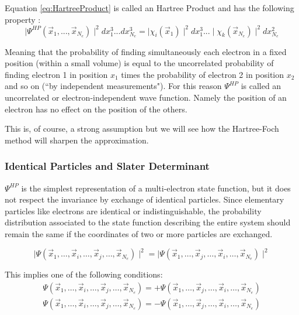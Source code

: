 \documentclass[a4paper,12pt]{article}
\begin{document}
Equation \eqref{eq:HartreeProduct} is called an Hartree Product and has the following property :
\begin{equation}\label{eq:uncorrelated}
	\mid\Psi^{HP}(\vec{x}_1,...,\vec{x}_{N_e}) \mid^2 dx_1^3 ... dx_{N_e}^3 = \mid\chi_i(\vec{x}_1)\mid^2 dx_1^3 ...\mid \chi_k(\vec{x}_{N_e})\mid^2 dx_{N_e}^2
\end{equation}

Meaning that the probability of finding simultaneously each electron in a fixed position (within a small volume) is equal to the uncorrelated probability of finding electron 1 in position $x_1$ times the probability of electron 2 in position $x_2$ and so on (``by independent measurements").
For this reason $\Psi^{HP}$ is called an uncorrelated or electron-independent wave function. Namely the position of an electron has no effect on the position of the others. 

This is, of course, a strong assumption but we will see how the Hartree-Foch method will sharpen the approximation.

\subsubsection{Identical Particles and Slater Determinant}

$\Psi^{HP}$ is the simplest representation of a multi-electron state function, but it does not respect the invariance by exchange of identical particles.
Since elementary particles like electrons are identical or indistinguishable, the probability distribution associated to the state function describing the entire system should remain the same if the coordinates of two or more particles are exchanged.

\begin{equation}
	\mid \Psi(\vec{x}_1,\dots,\vec{x}_i,\dots,\vec{x}_j,\dots,\vec{x}_{N_e}) \mid^2 = \mid \Psi(\vec{x}_1,\dots,\vec{x}_j,\dots,\vec{x}_i,\dots,\vec{x}_{N_e}) \mid^2
\end{equation}

This implies one of the following conditions:
\begin{align}
	\Psi(\vec{x}_1,\dots,\vec{x}_i,\dots,\vec{x}_j,\dots,\vec{x}_{N_e}) = +\Psi(\vec{x}_1,\dots,\vec{x}_j,\dots,\vec{x}_i,\dots,\vec{x}_{N_e})\\
	\Psi(\vec{x}_1,\dots,\vec{x}_i,\dots,\vec{x}_j,\dots,\vec{x}_{N_e}) = -\Psi(\vec{x}_1,\dots,\vec{x}_j,\dots,\vec{x}_i,\dots,\vec{x}_{N_e}) 
\end{align}
\end{document}
